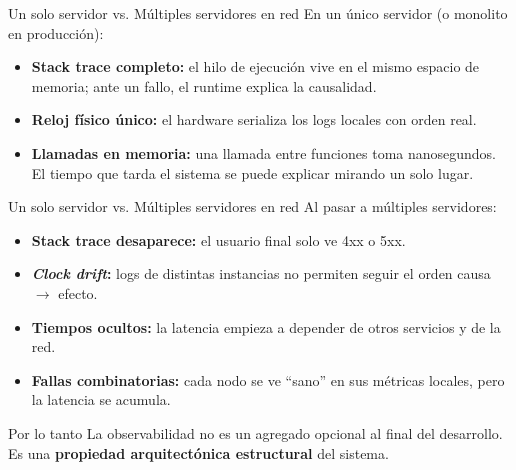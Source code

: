 \documentclass[institutional,screen,none]{../cls/ua-engineering-v6-beamer}
\begin{document}
\begin{frame}{Un solo servidor vs. Múltiples servidores en red}
En un único servidor (o monolito en producción):
\begin{itemize}
\item \textbf{Stack trace completo:} el hilo de ejecución vive en el mismo espacio de memoria; ante un fallo, el runtime explica la causalidad.
\item \textbf{Reloj físico único:} el hardware serializa los logs locales con orden real.
\item \textbf{Llamadas en memoria:} una llamada entre funciones toma nanosegundos. El tiempo que tarda el sistema se puede explicar mirando un solo lugar.
\end{itemize}

\end{frame}

\begin{frame}{Un solo servidor vs. Múltiples servidores en red}
Al pasar a múltiples servidores:
\begin{itemize}
\item \textbf{Stack trace desaparece:} el usuario final solo ve 4xx o 5xx.
\item \textbf{\emph{Clock drift}:} logs de distintas instancias no permiten seguir el orden causa $\rightarrow$ efecto.
\item \textbf{Tiempos ocultos:} la latencia empieza a depender de otros servicios y de la red.
\item \textbf{Fallas combinatorias:} cada nodo se ve ``sano'' en sus métricas locales, pero la latencia se acumula.
\end{itemize}

\pause

\begin{block}{Por lo tanto}
La observabilidad no es un agregado opcional al final del desarrollo. Es una \textbf{propiedad arquitectónica estructural} del sistema.
\end{block}
\end{frame}
\end{document}
